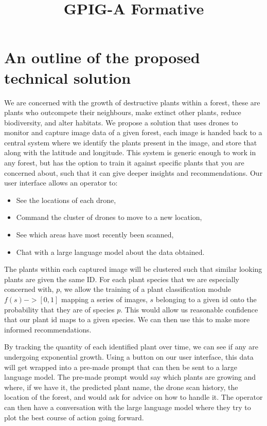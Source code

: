 \documentclass{article}
\title{GPIG-A Formative}
\begin{document}
\maketitle

\section{An outline of the proposed technical solution}

We are concerned with the growth of destructive plants within a forest, these are plants who outcompete their neighbours, make extinct other plants, reduce biodiversity, and alter habitats. 
We propose a solution that uses drones to monitor and capture image data of a given forest, each image is handed back to a central system where we identify the plants present in the image, and store that along with the latitude and longitude.
This system is generic enough to work in any forest, but has the option to train it against specific plants that you are concerned about, such that it can give deeper insights and recommendations.
Our user interface allows an operator to:
\begin{itemize}[noitemsep,topsep=3pt]
\item See the locations of each drone,
\item Command the cluster of drones to move to a new location,
\item See which areas have most recently been scanned,
\item Chat with a large language model about the data obtained.
\end{itemize}


The plants within each captured image will be clustered such that similar looking plants are given the same ID. 
For each plant species that we are especially concerned with, $p$, we allow the training of a plant classification module $f(s) -> [0,1]$ mapping a series of images, $s$ belonging to a given id onto the probability that they are of species $p$. 
This would allow us reasonable confidence that our plant id maps to a given species.
We can then use this to make more informed recommendations.

By tracking the quantity of each identified plant over time, we can see if any are undergoing exponential growth.
Using a button on our user interface, this data will get wrapped into a pre-made prompt that can then be sent to a large language model.
The pre-made prompt would say which plants are growing and where, if we have it, the predicted plant name, the drone scan history, the location of the forest, and would ask for advice on how to handle it.
The operator can then have a conversation with the large language model where they try to plot the best course of action going forward.
\end{document}
